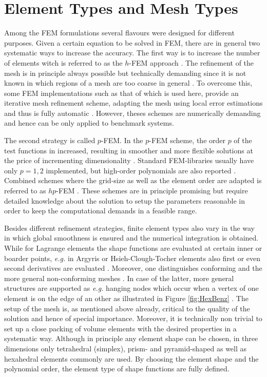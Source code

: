 \section{Element Types and Mesh Types}
\label{ch:feAss}
Among the FEM formulations several flavours were designed for different purposes.
Given a certain equation to be solved in FEM, there are in general two systematic ways to increase the accuracy.
The first way is to increase the number of elements witch is referred to as the $h$-FEM approach \cite{dreyer,}.
The refinement of the mesh is in principle always possible but technically demanding since it is not known in which regions of a mesh are too coarse in general \cite{dreyer}.
To overcome this, some FEM implementations such as that of  \cite{libmesh} which is used here, provide an iterative mesh refinement scheme, adapting the mesh using local error estimations and thus is fully automatic \cite{libmesh}.
However, theses schemes are numerically demanding and hence can be only applied to benchmark systems.

The second strategy is called $p$-FEM. 
In the $p$-FEM scheme, the order $p$ of the test functions in increased, resulting in smoother and more flexible solutions at the price of incrementing dimensionality \cite{p-fem}.
Standard FEM-libraries usually have only $p=1,2$ implemented, but high-order polynomials are also reported \cite{hermes}.
Combined schemes where the grid-size as well as the element order are adapted is referred to as $hp$-FEM \cite{hp-fem}.
These schemes are in principle promising but require detailed knowledge about the solution to setup the parameters reasonable in order to keep the computational demands in a feasible range.

Besides different refinement strategies, finite element types also vary in the way in which global smoothness is ensured and the numerical integration is obtained.
While for Lagrange elements the shape functions are evaluated at certain inner or boarder points, \textit{e.g.} in Argyris or Hsieh-Clough-Tocher elements also first or even second derivatives are evaluated \cite{femPraxis,femCiarlet}.
Moreover, one distinguishes conforming and the more general non-conforming meshes \cite{nonconfFEM}. In case of the latter, more general structures are supported as \textit{e.g.} hanging nodes which occur when a vertex of one element is on the edge of an other as illustrated in Figure \ref{fig:HexBenz} \cite{femCiarlet}.
The setup of the mesh is, as mentioned above already, critical to the quality of the solution and hence of special importance.
Moreover, it is technically non trivial to set up a close packing of volume elements with the desired properties in a systematic way.
Although in principle any element shape can be chosen, in three dimensions only tetrahedral (simplex), prism- and pyramid-shaped as well as hexahedral elements commonly are used.
By choosing the element shape and the polynomial order, the element type of shape functions are fully defined.

